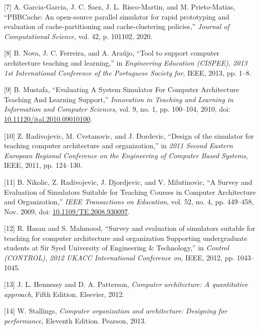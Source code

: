 \documentclass[12pt,twoside]{templates/unerthesis}
\begin{document}
\leavevmode\hypertarget{ref-garcia-garcia_pbbcache_2020}{}%
{[}7{]} A. Garcia-Garcia, J. C. Saez, J. L. Risco-Martin, and M. Prieto-Matias, ``PBBCache: An open-source parallel simulator for rapid prototyping and evaluation of cache-partitioning and cache-clustering policies,'' \emph{Journal of Computational Science}, vol. 42, p. 101102, 2020.

\leavevmode\hypertarget{ref-nova_tool_2013}{}%
{[}8{]} B. Nova, J. C. Ferreira, and A. Araújo, ``Tool to support computer architecture teaching and learning,'' in \emph{Engineering Education (CISPEE), 2013 1st International Conference of the Portuguese Society for}, IEEE, 2013, pp. 1--8.

\leavevmode\hypertarget{ref-mustafa_evaluating_2010}{}%
{[}9{]} B. Mustafa, ``Evaluating A System Simulator For Computer Architecture Teaching And Learning Support,'' \emph{Innovation in Teaching and Learning in Information and Computer Sciences}, vol. 9, no. 1, pp. 100--104, 2010, doi: \href{https://doi.org/10.11120/ital.2010.09010100}{10.11120/ital.2010.09010100}.

\leavevmode\hypertarget{ref-radivojevic_design_2011}{}%
{[}10{]} Z. Radivojevic, M. Cvetanovic, and J. Ðordevic, ``Design of the simulator for teaching computer architecture and organization,'' in \emph{2011 Second Eastern European Regional Conference on the Engineering of Computer Based Systems}, IEEE, 2011, pp. 124--130.

\leavevmode\hypertarget{ref-nikolic_survey_2009}{}%
{[}11{]} B. Nikolic, Z. Radivojevic, J. Djordjevic, and V. Milutinovic, ``A Survey and Evaluation of Simulators Suitable for Teaching Courses in Computer Architecture and Organization,'' \emph{IEEE Transactions on Education}, vol. 52, no. 4, pp. 449--458, Nov. 2009, doi: \href{https://doi.org/10.1109/TE.2008.930097}{10.1109/TE.2008.930097}.

\leavevmode\hypertarget{ref-hasan_survey_2012}{}%
{[}12{]} R. Hasan and S. Mahmood, ``Survey and evaluation of simulators suitable for teaching for computer architecture and organization Supporting undergraduate students at Sir Syed University of Engineering \& Technology,'' in \emph{Control (CONTROL), 2012 UKACC International Conference on}, IEEE, 2012, pp. 1043--1045.

\leavevmode\hypertarget{ref-hennessy_computer_2012}{}%
{[}13{]} J. L. Hennessy and D. A. Patterson, \emph{Computer architecture: A quantitative approach}, Fifth Edition. Elsevier, 2012.

\leavevmode\hypertarget{ref-stallings_computer_2013}{}%
{[}14{]} W. Stallings, \emph{Computer organization and architecture: Designing for performance}, Eleventh Edition. Pearson, 2013.
\end{document}
